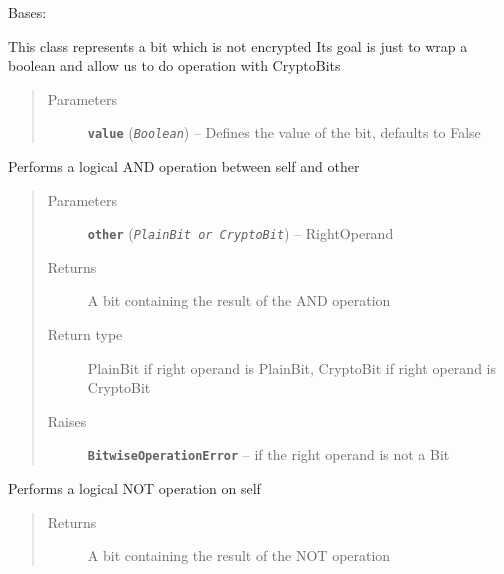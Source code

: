 \documentclass[letterpaper,10pt,english]{sphinxmanual}
\begin{document}

\begin{fulllineitems}
\label{datatypes.bits:datatypes.bits.Bit.PlainBit}
Bases: {\hyperref[datatypes.bits:datatypes.bits.Bit.Bit]{}}

This class represents a bit which is not encrypted
Its goal is just to wrap a boolean and allow us to do operation with CryptoBits
\begin{quote}\begin{description}
\item[{Parameters}] \leavevmode
\textbf{\texttt{value}} (\emph{\texttt{Boolean}}) -- Defines the value of the bit, defaults to False

\end{description}\end{quote}

\begin{fulllineitems}
\label{datatypes.bits:datatypes.bits.Bit.PlainBit.AND}
Performs a logical AND operation between self and other
\begin{quote}\begin{description}
\item[{Parameters}] \leavevmode
\textbf{\texttt{other}} (\emph{\texttt{PlainBit or CryptoBit}}) -- RightOperand

\item[{Returns}] \leavevmode
A bit containing the result of the AND operation

\item[{Return type}] \leavevmode
PlainBit if right operand is PlainBit, CryptoBit if right operand is CryptoBit

\item[{Raises}] \leavevmode
\textbf{\texttt{BitwiseOperationError}} -- if the right operand is not a Bit

\end{description}\end{quote}

\end{fulllineitems}


\begin{fulllineitems}
\label{datatypes.bits:datatypes.bits.Bit.PlainBit.NOT}
Performs a logical NOT operation on self
\begin{quote}\begin{description}
\item[{Returns}] \leavevmode
A bit containing the result of the NOT operation


\end{description}
\end{quote}
\end{fulllineitems}
\end{fulllineitems}
\end{document}
